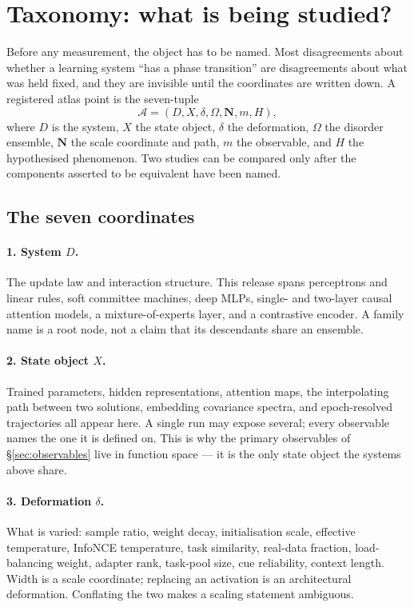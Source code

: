 \section{Taxonomy: what is being studied?}
\label{sec:taxonomy}

Before any measurement, the object has to be named. Most disagreements about
whether a learning system ``has a phase transition'' are disagreements about
what was held fixed, and they are invisible until the coordinates are written
down. A registered atlas point is the seven-tuple
\begin{equation}
  \mathcal A=(D,X,\delta,\Omega,\mathbf N,m,H),
  \label{eq:atlas-tuple}
\end{equation}
where $D$ is the system, $X$ the state object, $\delta$ the deformation,
$\Omega$ the disorder ensemble, $\mathbf N$ the scale coordinate and path, $m$
the observable, and $H$ the hypothesised phenomenon. Two studies can be
compared only after the components asserted to be equivalent have been named.

\subsection{The seven coordinates}

\paragraph{1. System $D$.}
The update law and interaction structure. This release spans perceptrons and
linear rules, soft committee machines, deep MLPs, single- and two-layer causal
attention models, a mixture-of-experts layer, and a contrastive encoder. A
family name is a root node, not a claim that its descendants share an ensemble.

\paragraph{2. State object $X$.}
Trained parameters, hidden representations, attention maps, the interpolating
path between two solutions, embedding covariance spectra, and epoch-resolved
trajectories all appear here. A single run may expose several; every observable
names the one it is defined on. This is why the primary observables of
\S\ref{sec:observables} live in function space --- it is the only state object
the systems above share.

\paragraph{3. Deformation $\delta$.}
What is varied: sample ratio, weight decay, initialisation scale, effective
temperature, InfoNCE temperature, task similarity, real-data fraction,
load-balancing weight, adapter rank, task-pool size, cue reliability, context
length. Width is a scale coordinate; replacing an activation is an
architectural deformation. Conflating the two makes a scaling statement
ambiguous.

